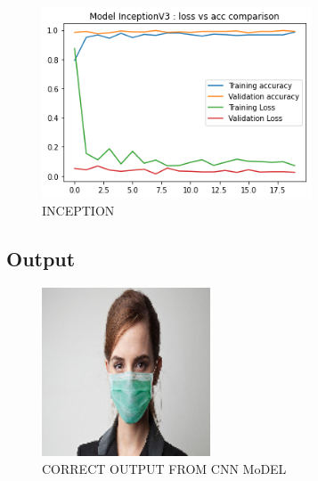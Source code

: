 \documentclass[conference]{IEEEtran}
\begin{document}
\begin{figure}[htbp]
        \centerline{\includegraphics[width=8cm]{INCEPTION.png}}
        \caption{INCEPTION}
        \label{output}
    \end{figure}
\newpage   
\subsection{Output}



\begin{figure}[htbp]
        \centerline{\includegraphics[width=5cm]{cnno.png}}
        \caption{CORRECT OUTPUT FROM CNN MoDEL}
        \label{output}
    \end{figure}
\end{document}
